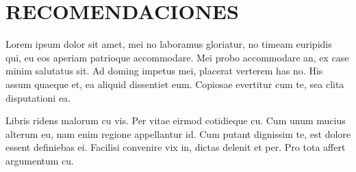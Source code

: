 \chapter*{\Large RECOMENDACIONES} 

Lorem ipsum dolor sit amet, mei no laboramus gloriatur, no timeam euripidis qui, eu eos aperiam patrioque accommodare. Mei probo accommodare an, ex case minim salutatus sit. Ad doming impetus mei, placerat verterem has no. His assum quaeque et, ea aliquid dissentiet eum. Copiosae evertitur cum te, sea clita disputationi ea.

Libris ridens malorum cu vis. Per vitae eirmod cotidieque cu. Cum unum mucius alterum eu, nam enim regione appellantur id. Cum putant dignissim te, est dolore essent definiebas ei. Facilisi convenire vix in, dictas delenit et per. Pro tota affert argumentum cu.